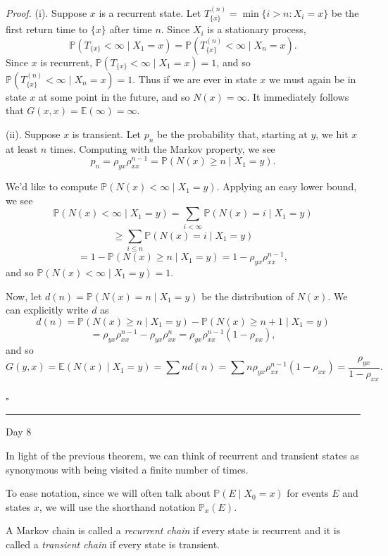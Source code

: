 \documentclass{problemset}
\newcommand{\E}{\mathbb{E}}
\newcommand{\1}{\mathbf{1}}
\renewcommand{\P}{\mathbb{P}}
\newcommand{\fatrule}[1]{\vspace{.3cm}\hrule {\hfill \sf #1}\par}
\newenvironment{proof}{\emph{Proof.}}{\hfill$\square$}
\begin{document}
	\begin{proof}
		(i).  Suppose $x$ is a recurrent state.  Let $T^{(n)}_{\{x\}}= \min\{i > n:X_i=x\}$
		be the first return time to $\{x\}$ after time $n$.
		Since $X_i$ is a stationary process,
		\[
			\P(T_{\{x\}} < \infty\mid X_1=x) = \P(T^{(n)}_{\{x\}} < \infty\mid X_n=x).
		\]
		Since $x$ is recurrent, $\P(T_{\{x\}} < \infty\mid X_1=x)=1$, and so
		$\P(T^{(n)}_{\{x\}} < \infty\mid X_n=x)=1$.  Thus if we are ever in state
		$x$ we must again be in state $x$ at some point in the future, and so $N(x)=\infty$.
		It immediately follows that $G(x,x) = \E(\infty) =\infty$.
		
		(ii). Suppose $x$ is transient. 
		Let $p_n$ be the probability that, starting at $y$, we hit $x$ at least $n$ times.  Computing
		with the Markov property, we see
		\[
			p_n = \rho_{yx}\rho_{xx}^{n-1}=\P(N(x)\geq n \mid X_1=y).
		\]

		We'd like to compute $\P(N(x) < \infty\mid X_1=y)$.  Applying an easy lower bound,
		we see
		\[
			\P(N(x) < \infty\mid X_1=y) = \sum_{i<\infty} \P(N(x) = i \mid X_1=y)
		\]\[
			\geq \sum_{i\leq n} \P(N(x) = i \mid X_1=y) 
		\]\[
			= 1-\P(N(x)\geq n \mid X_1=y) = 1-\rho_{yx}\rho_{xx}^{n-1},
		\]
		and so $\P(N(x) < \infty\mid X_1=y)=1$.

		Now, let $d(n) = \P(N(x) =n \mid X_1=y)$ be the distribution of $N(x)$.
		We can explicitly write $d$ as 
		\[
			d(n) = \P(N(x) \geq n \mid X_1=y) - \P(N(x) \geq n+1 \mid X_1=y)
		\]\[
			= \rho_{yx}\rho_{xx}^{n-1} - \rho_{yx}\rho_{xx}^{n} = \rho_{yx}\rho_{xx}^{n-1}(1-\rho_{xx}),
		\]
		and so
		\[
			G(y,x) = \E(N(x) \mid X_1=y) = \sum nd(n) = \sum n\rho_{yx}\rho_{xx}^{n-1}(1-\rho_{xx})
			=\frac{\rho_{yx}}{1-\rho_{xx}}.
		\]

	\end{proof}

	\fatrule{Day 8}

	In light of the previous theorem, we can think of recurrent and transient states as synonymous with
	being visited a finite number of times.

	To ease notation, since we will often 
	talk about $\P(E\mid X_0=x)$ for events $E$ and states $x$, we will use the shorthand notation $\P_x(E)$.

	\begin{definition}
		A Markov chain is called a \emph{recurrent chain} if every state is recurrent and
		it is called a \emph{transient chain} if every state is transient.
	\end{definition}
\end{document}
